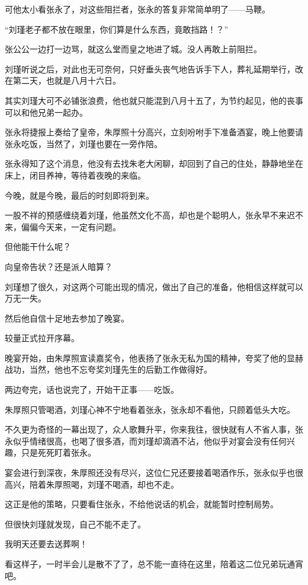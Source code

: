 \begin{multicols}{\theparacolNo}
		可他太小看张永了，对这些阻拦者，张永的答复非常简单明了——马鞭。

		“刘瑾老子都不放在眼里，你们算是什么东西，竟敢挡路！？”

		张公公一边打一边骂，就这么堂而皇之地进了城。没人再敢上前阻拦。

		刘瑾听说之后，对此也无可奈何，只好垂头丧气地告诉手下人，葬礼延期举行，改在第二天，也就是八月十六日。

		其实刘瑾大可不必铺张浪费，他也就只能混到八月十五了，为节约起见，他的丧事可以和他兄弟一起办。

		张永将捷报上奏给了皇帝，朱厚照十分高兴，立刻吩咐手下准备酒宴，晚上他要请张永吃饭，当然了，刘瑾也要在一旁作陪。

		张永得知了这个消息，他没有去找朱老大闲聊，却回到了自己的住处，静静地坐在床上，闭目养神，等待着夜晚的来临。

		今晚，就是今晚，最后的时刻即将到来。

		一股不祥的预感缠绕着刘瑾，他虽然文化不高，却也是个聪明人，张永早不来迟不来，偏偏今天来，一定有问题。

		但他能干什么呢？

		向皇帝告状？还是派人暗算？

		刘瑾想了很久，对这两个可能出现的情况，做出了自己的准备，他相信这样就可以万无一失。

		然后他自信十足地去参加了晚宴。

		较量正式拉开序幕。

		晚宴开始，由朱厚照宣读嘉奖令，他表扬了张永无私为国的精神，夸奖了他的显赫战功，当然，他也不忘夸奖刘瑾先生的后勤工作做得好。

		两边夸完，话也说完了，开始干正事——吃饭。

		朱厚照只管喝酒，刘瑾心神不宁地看着张永，张永却不看他，只顾着低头大吃。

		不久更为奇怪的一幕出现了，众人歌舞升平，你来我往，很快就有人不省人事，张永似乎情绪很高，也喝了很多酒，而刘瑾却滴酒不沾，他似乎对宴会没有任何兴趣，只是死死盯着张永。

		宴会进行到深夜，朱厚照还没有尽兴，这位仁兄还要接着喝酒作乐，张永似乎也很高兴，陪着朱厚照喝，刘瑾不喝酒，却也不走。

		这正是他的策略，只要看住张永，不给他说话的机会，就能暂时控制局势。

		但很快刘瑾就发现，自己不能不走了。

		我明天还要去送葬啊！

		看这样子，一时半会儿是散不了了，总不能一直待在这里，陪着这二位兄弟玩通宵吧。


\end{multicols}
